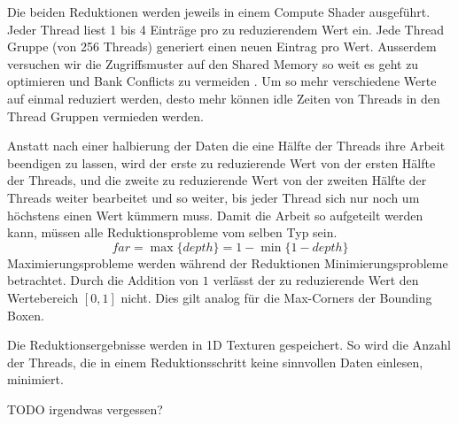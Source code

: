 \documentclass[runningheaders,a4paper]{llncs}
\begin{document}
Die beiden Reduktionen werden jeweils in einem Compute Shader ausgeführt.
Jeder Thread liest 1 bis 4 Einträge pro zu reduzierendem Wert ein.
Jede Thread Gruppe (von 256 Threads) generiert einen neuen Eintrag pro Wert.
Ausserdem versuchen wir die Zugriffsmuster auf den Shared Memory so weit es geht zu optimieren und Bank Conflicts zu vermeiden \cite{reduction}.
Um so mehr verschiedene Werte auf einmal reduziert werden, desto mehr können idle Zeiten von Threads in den Thread Gruppen vermieden werden.

Anstatt nach einer halbierung der Daten die eine Hälfte der Threads ihre Arbeit beendigen zu lassen, wird der erste zu reduzierende Wert von der ersten Hälfte der Threads, und die zweite zu reduzierende Wert von der zweiten Hälfte der Threads weiter bearbeitet und so weiter, bis jeder Thread sich nur noch um höchstens einen Wert kümmern muss.
Damit die Arbeit so aufgeteilt werden kann, müssen alle Reduktionsprobleme vom selben Typ sein.
\begin{equation}
  far = \max\{ depth \} = 1 - \min \{ 1 - depth \}
\end{equation}
Maximierungsprobleme werden während der Reduktionen Minimierungsprobleme betrachtet.
Durch die Addition von $1$ verlässt der zu reduzierende Wert den Wertebereich $[0, 1]$ nicht.
Dies gilt analog für die Max-Corners der Bounding Boxen.

Die Reduktionsergebnisse werden in 1D Texturen gespeichert.
So wird die Anzahl der Threads, die in einem Reduktionsschritt keine sinnvollen Daten einlesen, minimiert.




TODO irgendwas vergessen?


\end{document}
